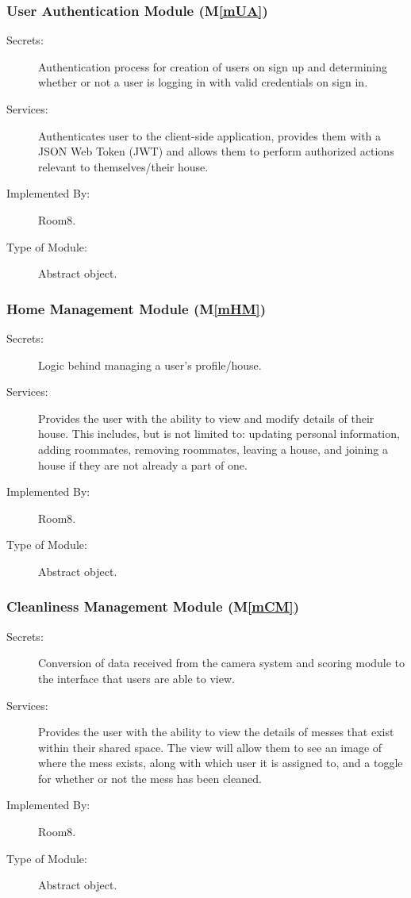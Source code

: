 \documentclass[12pt, titlepage]{article}
\newcommand{\mref}[1]{M\ref{#1}}
\begin{document}
\subsubsection{User Authentication Module (\mref{mUA})}
\begin{description}
\item[Secrets:] Authentication process for creation of users on sign up and determining whether or not a user is logging in with valid credentials on sign in.
\item[Services:] Authenticates user to the client-side application, provides them with a JSON Web Token (JWT) and allows them to perform authorized actions relevant to themselves/their house.
\item[Implemented By:] Room8.
\item[Type of Module:] Abstract object.
\end{description}

\subsubsection{Home Management Module (\mref{mHM})}
\begin{description}
\item[Secrets:] Logic behind managing a user's profile/house.
\item[Services:] Provides the user with the ability to view and modify details of their house. This includes, but is not limited to: updating personal information, adding roommates, removing roommates, leaving a house, and joining a house if they are not already a part of one. 
\item[Implemented By:] Room8.
\item[Type of Module:] Abstract object.
\end{description}

\subsubsection{Cleanliness Management Module (\mref{mCM})}
\begin{description}
\item[Secrets:] Conversion of data received from the camera system and scoring module to the interface that users are able to view.
\item[Services:] Provides the user with the ability to view the details of messes that exist within their shared space. The view will allow them to see an image of where the mess exists, along with which user it is assigned to, and a toggle for whether or not the mess has been cleaned.
\item[Implemented By:] Room8.
\item[Type of Module:] Abstract object.
\end{description}
\end{document}
